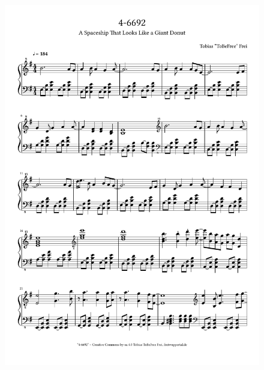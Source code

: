 \begin{figure}[p]
    \includegraphics[width=\textwidth, page=3]{z-include-ia2theme.pdf}
\end{figure}

